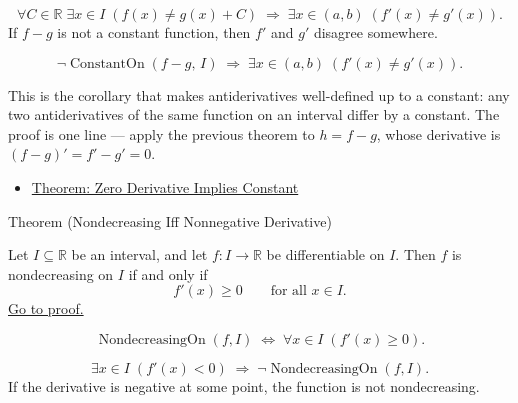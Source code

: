 \begin{remark*}
\[
\forall C \in \mathbb{R}\;\exists x \in I\;(f(x) \neq g(x)+C)
\;\Rightarrow\;
\exists x \in (a,b)\;(f'(x) \neq g'(x)).
\]
If $f - g$ is not a constant function, then $f'$ and $g'$ disagree somewhere.
\end{remark*}

\begin{remark*}
\[
\lnot\operatorname{ConstantOn}(f-g,\,I) \;\Rightarrow\; \exists x\in(a,b)\;(f'(x)\neq g'(x)).
\]
\end{remark*}

\begin{remark*}[Interpretation]
This is the corollary that makes antiderivatives well-defined up to a constant: any two antiderivatives of the same function on an interval differ by a constant. The proof is one line --- apply the previous theorem to $h = f - g$, whose derivative is $(f-g)' = f'-g' = 0$.
\end{remark*}

\begin{dependencies}
\begin{itemize}
  \item \hyperref[thm:zero-derivative-implies-constant]{Theorem: Zero Derivative Implies Constant}
\end{itemize}
\end{dependencies}


\begin{theorembox}{Theorem (Nondecreasing Iff Nonnegative Derivative)}
\begin{theorem}
\label{thm:nondecreasing-iff-nonneg-derivative}
Let $I \subseteq \mathbb{R}$ be an interval, and let $f : I \to \mathbb{R}$ be differentiable on $I$. Then $f$ is nondecreasing on $I$ if and only if
\[
f'(x) \geq 0 \qquad \text{for all } x \in I.
\]
\hyperref[prf:nondecreasing-iff-nonneg-derivative]{Go to proof.}
\end{theorem}
\end{theorembox}

\begin{remark*}
\[
\operatorname{NondecreasingOn}(f,I)
\;\iff\;
\forall x \in I\;(f'(x) \geq 0).
\]
\end{remark*}

\begin{remark*}
\[
\exists x \in I\;(f'(x) < 0)
\;\Rightarrow\;
\lnot\operatorname{NondecreasingOn}(f,I).
\]
If the derivative is negative at some point, the function is not nondecreasing.
\end{remark*}

